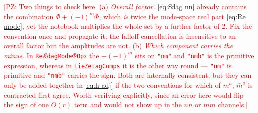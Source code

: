 \documentclass[preprint,aps,nofootinbib,a4paper,superscriptaddress,longbibliography,amsfonts, amssymb,amsmath,titlepage]{revtex4-1}
\numberwithin{equation}{section} %
\newcommand{\PZ}[1]{\textcolor{red}{\textsf{[PZ: #1]}}}
\newcommand{\emm}{m}
\renewcommand{\S}{{\mathcal S}}
\begin{document}
\PZ{Two things to check here.
(a) \emph{Overall factor.}  \eqref{eq:Sdag nn} already contains the
combination $\Phi+(-1)^{\emm}\bar\Phi$, which \emph{is} twice the mode-space
real part \eqref{eq:Re mode}, yet the notebook multiplies the whole set by a
further factor of 2.  Fix the convention once and propagate it; the falloff
cancellation is insensitive to an overall factor but the amplitudes are not.
(b) \emph{Which component carries the minus.}  In
\texttt{Re$\S$dagMode$\Phi$Ops} the $-(-1)^{\emm}$ sits on \texttt{"nm"} and
\texttt{"nmb"} is the primitive expression, whereas in
\texttt{LieZetagComps} it is the other way round --- \texttt{"nm"} is
primitive and \texttt{"nmb"} carries the sign.  Both are internally
consistent, but they can only be added together in \eqref{eq:h adj} if the
two conventions for which of $m^{a}$, $\bar m^{a}$ is contracted first agree.
Worth verifying explicitly, since an error here would flip the sign of one
$O(r)$ term and would not show up in the $nn$ or $mm$ channels.}
\end{document}
